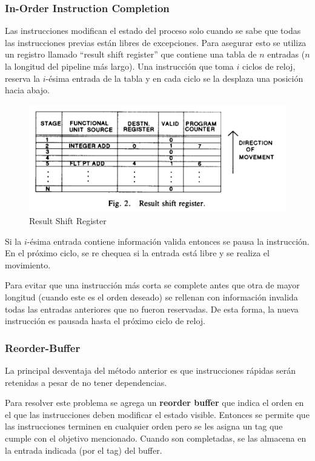 \subsubsection{In-Order Instruction Completion}
Las instrucciones modifican el estado del proceso solo cuando se sabe que todas las instrucciones previas están libres de excepciones. Para asegurar esto se utiliza un registro llamado ``result shift register'' que contiene una tabla de $n$  entradas ($n$ la longitud del pipeline más largo). Una instrucción que toma $i$ ciclos de reloj, reserva la $i$-ésima entrada de la tabla y en cada ciclo se la desplaza una posición hacia abajo.
\begin{figure}[ht]
	\centering
	\includegraphics[width=0.5\linewidth]{imagenes/shift-register}
	\caption{Result Shift Register}
	\label{fig:shiftregister}
\end{figure}

Si la $i$-ésima entrada contiene información valida entonces se pausa la instrucción. En el próximo ciclo, se re chequea si la entrada está libre y se realiza el movimiento.

Para evitar que una instrucción más corta se complete antes que otra de mayor longitud (cuando este es el orden deseado) se rellenan con información invalida todas las entradas anteriores que no fueron reservadas. De esta forma, la nueva instrucción es pausada hasta el próximo ciclo de reloj.

\subsubsection{Reorder-Buffer}
La principal desventaja del método anterior es que instrucciones rápidas serán retenidas a pesar de no tener dependencias.

Para resolver este problema se agrega un \textbf{reorder buffer} que indica el orden en el que las instrucciones deben modificar el estado visible. Entonces se permite que las instrucciones terminen en cualquier orden pero se les asigna un tag que cumple con el objetivo mencionado. Cuando son completadas, se las almacena en la entrada indicada (por el tag) del buffer.

